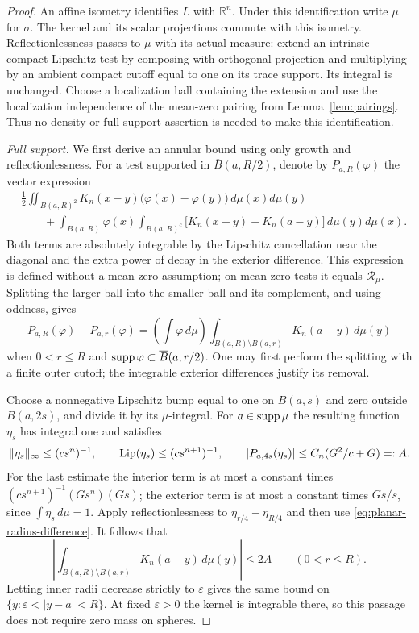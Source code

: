 \begin{proof}
An affine isometry identifies $L$ with $\mathbb R^n$.  Under this
identification write $\mu$ for $\sigma$.  The kernel and its scalar
projections commute with this isometry.  Reflectionlessness passes to
$\mu$ with its actual measure: extend an intrinsic compact Lipschitz test
by composing with orthogonal projection and multiplying by an ambient
compact cutoff equal to one on its trace support.  Its integral is
unchanged.  Choose a localization ball containing the extension and use
the localization independence of the mean-zero pairing from
Lemma~\ref{lem:pairings}.  Thus no density or full-support assertion is
needed to make this identification.

\emph{Full support.}
We first derive an annular bound using only growth and
reflectionlessness.  For a test supported in $\overline B(a,R/2)$, denote by
$P_{a,R}(\varphi)$ the vector expression
\begin{align*}
 &\frac12\iint_{B(a,R)^2}
 K_n(x-y)\bigl(\varphi(x)-\varphi(y)\bigr)\,d\mu(x)d\mu(y)\\
 &\qquad+\int_{B(a,R)}\varphi(x)
 \int_{B(a,R)^c}\bigl[K_n(x-y)-K_n(a-y)\bigr]\,d\mu(y)d\mu(x).
\end{align*}
Both terms are absolutely integrable by the Lipschitz cancellation near
the diagonal and the extra power of decay in the exterior difference.
This expression is defined without a mean-zero assumption; on mean-zero
tests it equals $\mathcal R_\mu$.  Splitting the larger ball into the
smaller ball and its complement, and using oddness, gives
\begin{equation}\label{eq:planar-radius-difference}
 P_{a,R}(\varphi)-P_{a,r}(\varphi)
 =\left(\int\varphi\,d\mu\right)
   \int_{B(a,R)\setminus B(a,r)}K_n(a-y)\,d\mu(y)
\end{equation}
when $0<r\le R$ and $\operatorname{supp}\varphi\subset\overline B(a,r/2)$.
One may first perform the splitting with a finite outer cutoff; the
integrable exterior differences justify its removal.

Choose a nonnegative Lipschitz bump equal to one on $B(a,s)$ and zero
outside $B(a,2s)$, and divide it by its $\mu$-integral.  For $a\in\operatorname{supp}\mu$
the resulting function $\eta_s$ has integral one and satisfies
\[
 \|\eta_s\|_\infty\le (cs^n)^{-1},\qquad
 \operatorname{Lip}(\eta_s)\le (cs^{n+1})^{-1},\qquad
 |P_{a,4s}(\eta_s)|\le C_n(G^2/c+G)=:A.
\]
For the last estimate the interior term is at most a constant times
$(cs^{n+1})^{-1}(Gs^n)(Gs)$; the exterior term is at most a constant
times $Gs/s$, since $\int\eta_s\,d\mu=1$.
Apply reflectionlessness to $\eta_{r/4}-\eta_{R/4}$ and then use
\eqref{eq:planar-radius-difference}.  It follows that
\[
 \left|\int_{B(a,R)\setminus B(a,r)}K_n(a-y)\,d\mu(y)\right|
 \le 2A\qquad(0<r\le R).
\]
Letting inner radii decrease strictly to $\varepsilon$ gives the same
bound on $\{y:\varepsilon<|y-a|<R\}$.  At fixed
$\varepsilon>0$ the kernel is integrable there, so this passage does not
require zero mass on spheres.


\end{proof}
